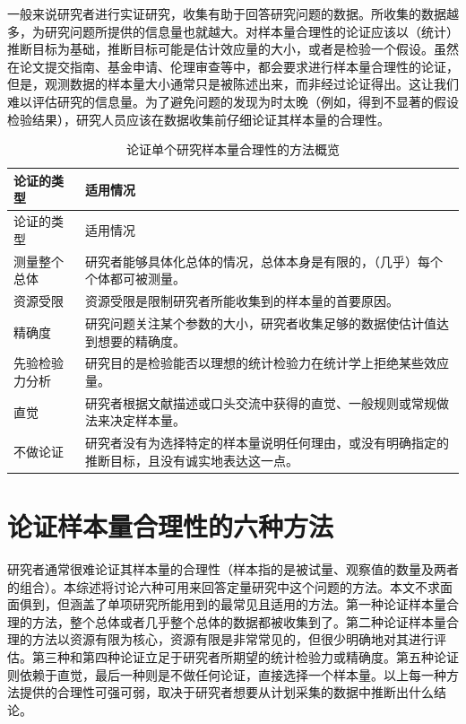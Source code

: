 \documentclass[
  letterpaper,
  DIV=11,
  numbers=noendperiod]{scrreprt}
\begin{document}
一般来说研究者进行实证研究，收集有助于回答研究问题的数据。所收集的数据越多，为研究问题所提供的信息量也就越大。对样本量合理性的论证应该以（统计）推断目标为基础，推断目标可能是估计效应量的大小，或者是检验一个假设。虽然在论文提交指南、基金申请、伦理审查等中，都会要求进行样本量合理性的论证，但是，观测数据的样本量大小通常只是被陈述出来，而非经过论证得出。这让我们难以评估研究的信息量。为了避免问题的发现为时太晚（例如，得到不显著的假设检验结果），研究人员应该在数据收集前仔细论证其样本量的合理性。

\hypertarget{tbl-table-pow-just}{}
\begin{longtable}[]{@{}ll@{}}
\caption{\label{tbl-table-pow-just}论证单个研究样本量合理性的方法概览}\tabularnewline
\toprule\noalign{}
论证的类型 & 适用情况 \\
\midrule\noalign{}
\endfirsthead
\toprule\noalign{}
论证的类型 & 适用情况 \\
\midrule\noalign{}
\endhead
\bottomrule\noalign{}
\endlastfoot
测量整个总体 &
研究者能够具体化总体的情况，总体本身是有限的，（几乎）每个个体都可被测量。 \\
资源受限 & 资源受限是限制研究者所能收集到的样本量的首要原因。 \\
精确度 &
研究问题关注某个参数的大小，研究者收集足够的数据使估计值达到想要的精确度。 \\
先验检验力分析 &
研究目的是检验能否以理想的统计检验力在统计学上拒绝某些效应量。 \\
直觉 &
研究者根据文献描述或口头交流中获得的直觉、一般规则或常规做法来决定样本量。 \\
不做论证 &
研究者没有为选择特定的样本量说明任何理由，或没有明确指定的推断目标，且没有诚实地表达这一点。 \\
\end{longtable}

\hypertarget{ux8bbaux8bc1ux6837ux672cux91cfux5408ux7406ux6027ux7684ux516dux79cdux65b9ux6cd5}{%
\section{论证样本量合理性的六种方法}\label{ux8bbaux8bc1ux6837ux672cux91cfux5408ux7406ux6027ux7684ux516dux79cdux65b9ux6cd5}}

研究者通常很难论证其样本量的合理性（样本指的是被试量、观察值的数量及两者的组合）。本综述将讨论六种可用来回答定量研究中这个问题的方法。本文不求面面俱到，但涵盖了单项研究所能用到的最常见且适用的方法。第一种论证样本量合理的方法，整个总体或者几乎整个总体的数据都被收集到了。第二种论证样本量合理的方法以资源有限为核心，资源有限是非常常见的，但很少明确地对其进行评估。第三种和第四种论证立足于研究者所期望的统计检验力或精确度。第五种论证则依赖于直觉，最后一种则是不做任何论证，直接选择一个样本量。以上每一种方法提供的合理性可强可弱，取决于研究者想要从计划采集的数据中推断出什么结论。
\end{document}
